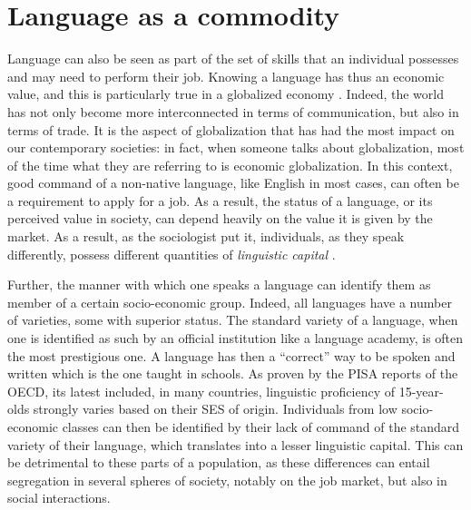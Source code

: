 \documentclass[../thesis.tex]{subfiles}
\begin{document}
\section{Language as a commodity} %
Language can also be seen as part of the set of skills that an individual possesses and
may need to perform their job. Knowing a language has thus an economic value, and this
is particularly true in a globalized economy \cite{HellerCommodificationLanguage2010}.
Indeed, the world has not only become more interconnected in terms of communication, but
also in terms of trade. It is the aspect of globalization that has had the most impact
on our contemporary societies: in fact, when someone talks about globalization, most of
the time what they are referring to is economic globalization. In this context, good
command of a non-native language, like English in most cases, can often be a requirement
to apply for a job. As a result, the status of a language, or its perceived value in
society, can depend heavily on the value it is given by the market. As a result, as the
sociologist  put it, individuals, as
they speak differently, possess different quantities of \emph{linguistic capital}
\cite{BourdieuLanguageSymbolic2009}.

Further, the manner with which one speaks a language can identify them as member of a
certain socio-economic group. Indeed, all languages have a number of varieties, some
with superior status. The standard variety of a language, when one is identified as such
by an official institution like a language academy, is often the most prestigious one. A
language has then a ``correct'' way to be spoken and written which is the one taught in
schools. As proven by the PISA reports of the OECD, its latest \cite{OECDWhereAll2019}
included, in many countries, linguistic proficiency of 15-year-olds strongly varies
based on their \ac{SES} of origin. Individuals from low socio-economic classes can then
be identified by their lack of command of the standard variety of their language, which
translates into a lesser linguistic capital. This can be detrimental to these parts of a
population, as these differences can entail segregation in several spheres of society,
notably on the job market, but also in social interactions.

\end{document}
